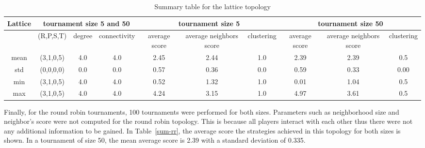 \begin{table}[!hbtp]
	\centering
	\begin{adjustbox}{width=1\textwidth}
		\small
		\begin{tabular}{cccccccccc}
				\toprule
			Lattice & \multicolumn{3}{|c|}{tournament size 5 and 50} & \multicolumn{3}{c|}{tournament size 5} & \multicolumn{3}{c}{tournament size 50}                            \\ \midrule
			     & (R,P,S,T) & degree & connectivity & average score & average neighbors score & clustering & average score & average neighbors score & clustering \\ \midrule
			mean & (3,1,0,5) & 4.0    & 4.0          & 2.45          & 2.44                    & 1.0        & 2.39          & 2.39                    & 0.5        \\ \midrule
			std  & (0,0,0,0) & 0.0    & 0.0          & 0.57          & 0.36                    & 0.0        & 0.59          & 0.33                    & 0.00       \\ \midrule
			min  & (3,1,0,5) & 4.0    & 4.0          & 0.52          & 1.32                    & 1.0        & 0.01          & 1.04                    & 0.5        \\ \midrule
			max  & (3,1,0,5) & 4.0    & 4.0          & 4.24          & 3.15                    & 1.0        & 4.97          & 3.61                    & 0.5        \\ \bottomrule
		\end{tabular}
	\end{adjustbox}
	\caption{Summary table for the lattice topology}
	\label{sum-lattice}
\end{table}

Finally, for the round robin tournaments, 100 tournaments were performed for both
sizes. Parameters such as neighborhood size and neighbor's score
were not computed for the round robin topology. This is because all players
interact with each other thus there were not any additional information to be
gained. In Table~\ref{sum-rr}, the average score the strategies achieved
in this topology for both sizes is shown. In a tournament of size 50, the mean average
score is 2.39 with a standard deviation of 0.335.


